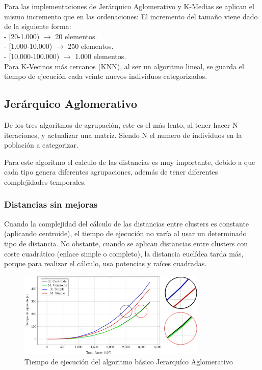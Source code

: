 	\begin{flushleft}
	\begin{tcolorbox}[boxrule=0.5pt, fontupper=\small]
		\scriptsize
		Para las implementaciones de Jerárquico Aglomerativo y K-Medias se aplican el mismo incremento que en las ordenaciones:
		El incremento del tamaño viene dado de la siguiente forma:\\
		- [20-1.000) $\rightarrow$ 20 elementos.\\
		- [1.000-10.000) $\rightarrow$ 250 elementos.\\
		- [10.000-100.000) $\rightarrow$ 1.000 elementos.\\
		
		Para K-Vecinos más cercanos (KNN), al ser un algoritmo lineal, se guarda el tiempo de ejecución cada veinte nuevos individuos categorizados.
		
	\end{tcolorbox}		
	\end{flushleft}

	\subsection{Jerárquico Aglomerativo}
	
		De los tres algoritmos de agrupación, este es el más lento, al tener hacer N iteraciones, y actualizar una matriz. Siendo N el numero de individuos en la población a categorizar.
		
		Para este algoritmo el calculo de las distancias es muy importante, debido a que cada tipo genera diferentes agrupaciones, además de tener diferentes complejidades temporales.
		
		\subsubsection{Distancias sin mejoras}		

		Cuando la complejidad del cálculo de las distancias entre clusters es constante (aplicando centroide), el tiempo de ejecución no varía al usar un determinado tipo de distancia.
		No obstante, cuando se aplican distancias entre clusters con coste cuadrático (enlace simple o completo), la distancia euclídea tarda más, porque para realizar el cálculo, usa potencias y raíces cuadradas.


		\begin{figure}[!h]
			\centering
			\includegraphics[width=0.8\textwidth]{images/chapter_4/jerarquico}
			\caption{Tiempo de ejecución del algoritmo básico Jerarquíco Aglomerativo}
			\label{fig:prueba_jerarquicosec}
		\end{figure}

